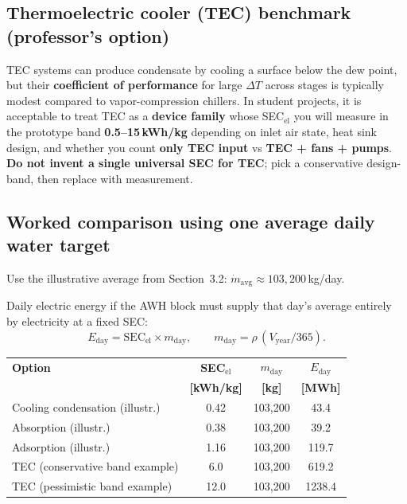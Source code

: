 \documentclass[11pt,a4paper]{article}
\begin{document}
\subsection{Thermoelectric cooler (TEC) benchmark (professor's option)}
TEC systems can produce condensate by cooling a surface below the dew point, but their \textbf{coefficient of performance} for large $\Delta T$ across stages is typically modest compared to vapor-compression chillers. In student projects, it is acceptable to treat TEC as a \textbf{device family} whose SEC$_{\mathrm{el}}$ you will measure in the prototype band \textbf{0.5--15\,kWh/kg} depending on inlet air state, heat sink design, and whether you count \textbf{only TEC input} vs \textbf{TEC + fans + pumps}. \textbf{Do not invent a single universal SEC for TEC}; pick a conservative design-band, then replace with measurement.

\subsection{Worked comparison using \textbf{one} average daily water target}
Use the illustrative average from Section~3.2: $\dot m_{\mathrm{avg}}\approx 103{,}200$\,kg/day.

Daily electric energy if the AWH block must supply that day's average entirely by electricity at a fixed SEC:
\begin{equation}
E_{\mathrm{day}} = \mathrm{SEC}_{\mathrm{el}}\times m_{\mathrm{day}},
\qquad m_{\mathrm{day}}=\rho\,(V_{\mathrm{year}}/365).
\end{equation}

\begin{center}
\small
\begin{tabular}{@{}lccc@{}}
\toprule
\textbf{Option} & \textbf{SEC$_{\mathrm{el}}$} & \textbf{$m_{\mathrm{day}}$} & \textbf{$E_{\mathrm{day}}$} \\
 & \textbf{[kWh/kg]} & \textbf{[kg]} & \textbf{[MWh]} \\
\midrule
Cooling condensation (illustr.) & 0.42 & 103{,}200 & 43.4 \\
Absorption (illustr.) & 0.38 & 103{,}200 & 39.2 \\
Adsorption (illustr.) & 1.16 & 103{,}200 & 119.7 \\
TEC (conservative band example) & 6.0 & 103{,}200 & 619.2 \\
TEC (pessimistic band example) & 12.0 & 103{,}200 & 1238.4 \\
\bottomrule
\end{tabular}
\end{center}
\normalsize
\end{document}

